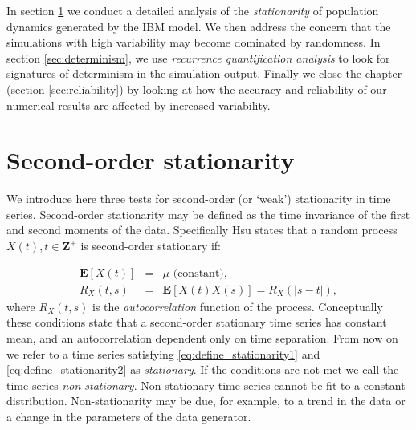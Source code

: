 In section \ref{sec:stationarity} we conduct a detailed analysis of the \emph{stationarity} of population dynamics generated by the IBM model. We then address the concern that the simulations with high variability may become dominated by randomness. In section \ref{sec:determinism}, we use \emph{recurrence quantification analysis} to look for signatures of determinism in the simulation output. Finally we close the chapter (section \ref{sec:reliability}) by looking at how the accuracy and reliability of our numerical results are affected by increased variability.
 


\section{Second-order stationarity}
\label{sec:stationarity}



We introduce here three tests for second-order (or `weak') stationarity in time series.  Second-order stationarity may be defined as the time invariance of the first and second moments of the data. Specifically Hsu \cite{hsu1997schaum} states that a random process $X(t), t \in \mathbf{Z}^+$ is second-order stationary if:

\begin{eqnarray}
	\mathbf{E}[X(t)] &=& \mu \text{ (constant),}\label{eq:define_stationarity1}\\
	R_X(t,s) &=& \mathbf{E}[X(t)X(s)] = R_X(|s-t|),\label{eq:define_stationarity2}
\end{eqnarray}
%
where $R_X(t,s)$ is the \emph{autocorrelation} function of the process. Conceptually these conditions state that a second-order stationary time series has constant mean, and an autocorrelation dependent only on time separation. From now on we refer to a time series satisfying \ref{eq:define_stationarity1} and \ref{eq:define_stationarity2} as \emph{stationary}. If the conditions are not met we call the time series \emph{non-stationary}. Non-stationary time series cannot be fit to a constant distribution. Non-stationarity may be due, for example, to a trend in the data or a change in the parameters of the data generator.

